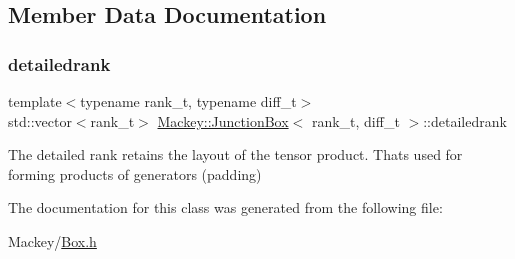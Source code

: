 \subsection{Member Data Documentation}
\mbox{\label{classMackey_1_1JunctionBox_ae1bd899e721eebc9b22ccccf506e774e}} 
\subsubsection{\texorpdfstring{detailedrank}{detailedrank}}
{\footnotesize\ttfamily template$<$typename rank\+\_\+t, typename diff\+\_\+t$>$ \\
std\+::vector$<$rank\+\_\+t$>$ \hyperlink{classMackey_1_1JunctionBox}{Mackey\+::\+Junction\+Box}$<$ rank\+\_\+t, diff\+\_\+t $>$\+::detailedrank}



The detailed rank retains the layout of the tensor product. That\textquotesingle{}s used for forming products of generators (padding) 



The documentation for this class was generated from the following file\+:\begin{DoxyCompactItemize}
\item 
Mackey/\hyperlink{Box_8h}{Box.\+h}\end{DoxyCompactItemize}

